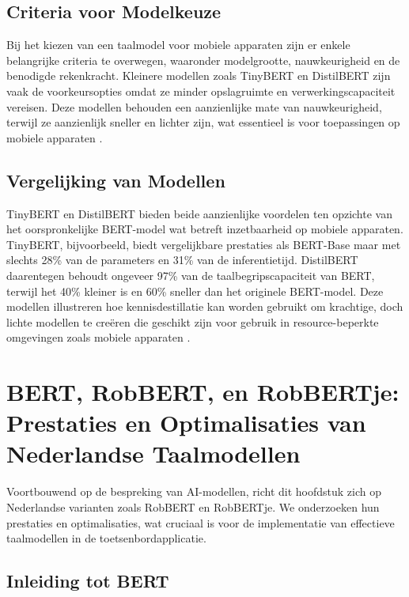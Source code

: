 \subsection{Criteria voor Modelkeuze}

Bij het kiezen van een taalmodel voor mobiele apparaten zijn er enkele belangrijke criteria te overwegen, waaronder modelgrootte, nauwkeurigheid en de benodigde rekenkracht. Kleinere modellen zoals TinyBERT en DistilBERT zijn vaak de voorkeursopties omdat ze minder opslagruimte en verwerkingscapaciteit vereisen. Deze modellen behouden een aanzienlijke mate van nauwkeurigheid, terwijl ze aanzienlijk sneller en lichter zijn, wat essentieel is voor toepassingen op mobiele apparaten \autocite{Sun2020MobileBERT}.

\subsection{Vergelijking van Modellen}

TinyBERT en DistilBERT bieden beide aanzienlijke voordelen ten opzichte van het oorspronkelijke BERT-model wat betreft inzetbaarheid op mobiele apparaten. TinyBERT, bijvoorbeeld, biedt vergelijkbare prestaties als BERT-Base maar met slechts 28\% van de parameters en 31\% van de inferentietijd. DistilBERT daarentegen behoudt ongeveer 97\% van de taalbegripscapaciteit van BERT, terwijl het 40\% kleiner is en 60\% sneller dan het originele BERT-model. Deze modellen illustreren hoe kennisdestillatie kan worden gebruikt om krachtige, doch lichte modellen te creëren die geschikt zijn voor gebruik in resource-beperkte omgevingen zoals mobiele apparaten \autocite{Sanh2019DistilBERT}.


\section{BERT, RobBERT, en RobBERTje: Prestaties en Optimalisaties van Nederlandse Taalmodellen}

Voortbouwend op de bespreking van AI-modellen, richt dit hoofdstuk zich op Nederlandse varianten zoals RobBERT en RobBERTje. We onderzoeken hun prestaties en optimalisaties, wat cruciaal is voor de implementatie van effectieve taalmodellen in de toetsenbordapplicatie.

\subsection{Inleiding tot BERT}

